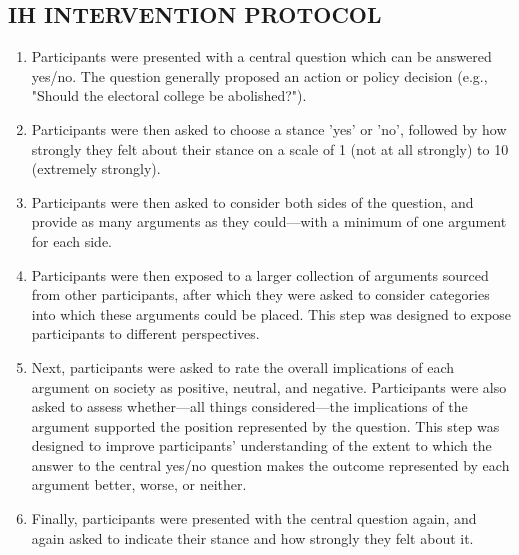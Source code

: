\documentclass[journal]{IEEEtran}
\begin{document}
\subsection{IH INTERVENTION PROTOCOL}
\label{section:ih-intervention-protocol}
\begin{enumerate}
    \item Participants were presented with a central question which can be answered yes/no. The question generally proposed an action or policy decision (e.g., "Should the electoral college be abolished?").
    \item Participants were then asked to choose a stance 'yes' or 'no', followed by how strongly they felt about their stance on a scale of 1 (not at all strongly) to 10 (extremely strongly).
    \item Participants were then asked to consider both sides of the question, and provide as many arguments as they could---with a minimum of one argument for each side.
    \item Participants were then exposed to a larger collection of arguments sourced from other participants, after which they were asked to consider categories into which these arguments could be placed. This step was designed to expose participants to different perspectives.
    \item Next, participants were asked to rate the overall implications of each argument on society as positive, neutral, and negative. Participants were also asked to assess whether---all things considered---the implications of the argument supported the position represented by the question. This step was designed to improve participants' understanding of the extent to which the answer to the central yes/no question makes the outcome represented by each argument better, worse, or neither.
    \item Finally, participants were presented with the central question again, and again asked to indicate their stance and how strongly they felt about it.
\end{enumerate}
\end{document}
